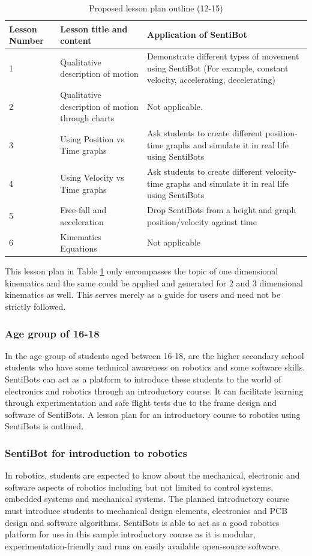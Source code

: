 \documentclass[12pt]{article}
\begin{document}
\begin{table}[h]
	\centering
	\begin{tabularx}{\linewidth}{ | >{\setlength\hsize{.2\hsize}} X | >{\setlength\hsize{.5\hsize}} X | X | }
		Lesson Number & Lesson title and content & Application of SentiBot \\
		\hline
		1 & Qualitative description of motion & Demonstrate different types of movement using SentiBot (For example, constant velocity, accelerating, decelerating) \\
		2 & Qualitative description of motion through charts & Not applicable. \\
		3 & Using Position vs Time graphs & Ask students to create different position-time graphs and simulate it in real life using SentiBots \\
		4 & Using Velocity vs Time graphs & Ask students to create different velocity-time graphs and simulate it in real life using SentiBots \\
		5 & Free-fall and acceleration & Drop SentiBots from a height and graph position/velocity against time \\
		6 & Kinematics Equations & Not applicable \\
	\end{tabularx}
	\caption{Proposed lesson plan outline (12-15)}
	\label{tab:lessonplan}
\end{table}

This lesson plan in Table \ref{tab:lessonplan} only encompasses the topic of one dimensional kinematics and the same could be applied and generated for 2 and 3 dimensional kinematics as well. This serves merely as a guide for users and need not be strictly followed.

\subsubsection{Age group of 16-18}

In the age group of students aged between 16-18, are the higher secondary school students who have some technical awareness on robotics and some software skills. SentiBots can act as a platform to introduce these students to the world of electronics and robotics through an introductory course. It can facilitate learning through experimentation and safe flight tests due to the frame design and software of SentiBots. A lesson plan for an introductory course to robotics using SentiBots is outlined.

\subsubsection{SentiBot for introduction to robotics}
In robotics, students are expected to know about the mechanical, electronic and software aspects of robotics including but not limited to control systems, embedded systems and mechanical systems. The planned introductory course must introduce students to mechanical design elements, electronics and PCB design and software algorithms. SentiBots is able to act as a good robotics platform for use in this sample introductory course as it is modular, experimentation-friendly and runs on easily available open-source software.
\end{document}

